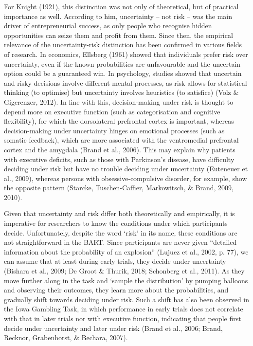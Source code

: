 \documentclass[serif, twocolumn, review]{jote-article}
\begin{document}
For Knight (1921), this distinction was not only of theoretical, but of practical importance as well. According to him, uncertainty -- not risk -- was the main driver of entrepreneurial success, as only people who recognise hidden opportunities can seize them and profit from them. Since then, the empirical relevance of the uncertainty-risk distinction has been confirmed in various fields of research. In economics, Ellsberg (1961) showed that individuals prefer risk over uncertainty, even if the known probabilities are unfavourable and the uncertain option could be a guaranteed win. In psychology, studies showed that uncertain and risky decisions involve different mental processes, as risk allows for statistical thinking (to optimise) but uncertainty involves heuristics (to satisfice) (Volz \& Gigerenzer, 2012). In line with this, decision-making under risk is thought to depend more on executive function (such as categorisation and cognitive flexibility), for which the dorsolateral prefrontal cortex is important, whereas decision-making under uncertainty hinges on emotional processes (such as somatic feedback), which are more associated with the ventromedial prefrontal cortex and the amygdala (Brand et al., 2006). This may explain why patients with executive deficits, such as those with Parkinson's disease, have difficulty deciding under risk but have no trouble deciding under uncertainty (Euteneuer et al., 2009), whereas persons with obsessive-compulsive disorder, for example, show the opposite pattern (Starcke, Tuschen-Caffier, Markowitsch, \& Brand, 2009, 2010).

Given that uncertainty and risk differ both theoretically and empirically, it is imperative for researchers to know the conditions under which participants decide. Unfortunately, despite the word `risk' in its name, these conditions are not straightforward in the BART. Since participants are never given ``detailed information about the probability of an explosion'' (Lujuez et al., 2002, p. 77), we can assume that at least during early trials, they decide under uncertainty (Bishara et al., 2009; De Groot \& Thurik, 2018; Schonberg et al., 2011). As they move further along in the task and `sample the distribution' by pumping balloons and observing their outcomes, they learn more about the probabilities, and gradually shift towards deciding under risk. Such a shift has also been observed in the Iowa Gambling Task, in which performance in early trials does not correlate with that in later trials nor with executive function, indicating that people first decide under uncertainty and later under risk (Brand et al., 2006; Brand, Recknor, Grabenhorst, \& Bechara, 2007).
\end{document}
